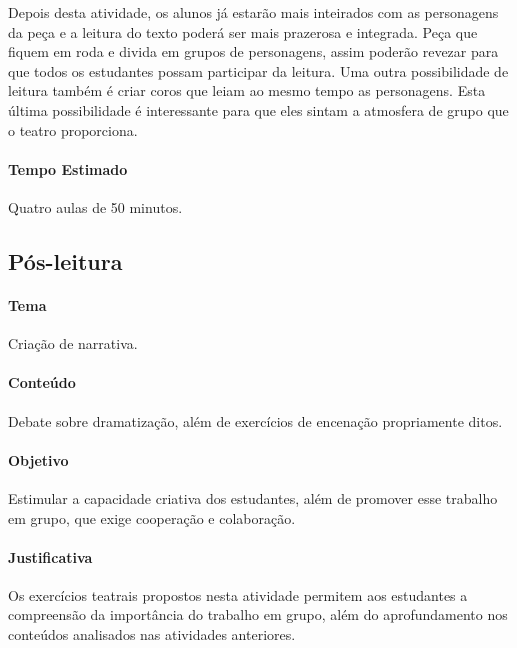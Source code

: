 \documentclass[11pt]{extarticle}
\begin{document}

Depois desta atividade, os alunos já estarão mais inteirados com as personagens da peça e a leitura do texto poderá ser mais prazerosa e integrada. Peça que fiquem em roda e divida em grupos de personagens, assim poderão revezar para que todos os estudantes possam participar da leitura. Uma outra possibilidade de leitura também é criar coros que leiam ao mesmo tempo as personagens. Esta última possibilidade é interessante para que eles sintam a atmosfera de grupo que o teatro proporciona.

\paragraph{Tempo Estimado} Quatro aulas de 50 minutos. 

\subsection{Pós-leitura} 


\paragraph{Tema} Criação de narrativa. 

\paragraph{Conteúdo} Debate sobre dramatização, além de exercícios de encenação propriamente ditos. 

\paragraph{Objetivo} Estimular a capacidade criativa dos estudantes, além de promover esse trabalho em grupo, que exige cooperação e colaboração. 

\paragraph{Justificativa} Os exercícios teatrais propostos nesta atividade permitem aos estudantes a compreensão da importância do trabalho em grupo, além do aprofundamento nos conteúdos analisados nas atividades anteriores.   
\end{document}
